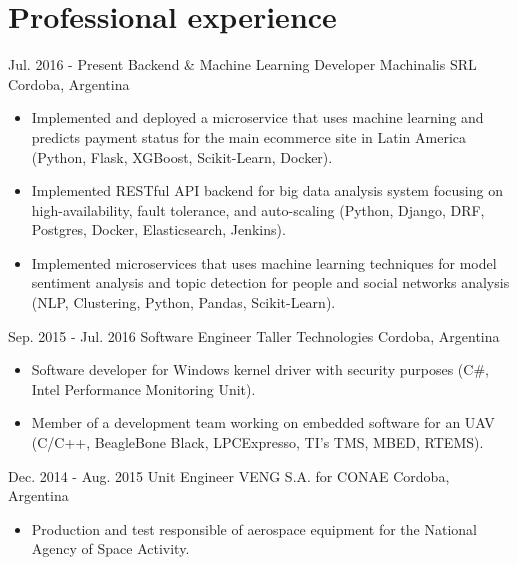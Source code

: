 
\section{Professional experience}

  \cventry
    {Jul. 2016 - Present} %
    {Backend \& Machine Learning Developer} %
    {Machinalis SRL} %
    {Cordoba, Argentina} %
    {}
    {
      \begin{itemize} %
        \item {Implemented and deployed a microservice that uses machine learning and predicts payment status for the main ecommerce site in Latin America (Python, Flask, XGBoost, Scikit-Learn, Docker).}
        \item {Implemented RESTful API backend for big data analysis system focusing on high-availability, fault tolerance, and auto-scaling (Python, Django, DRF, Postgres, Docker, Elasticsearch, Jenkins).}
        \item {Implemented microservices that uses machine learning techniques for model sentiment analysis and topic detection for people and social networks analysis (NLP, Clustering, Python, Pandas, Scikit-Learn).}
      \end{itemize}
    }

  \cventry
    {Sep. 2015 - Jul. 2016} %
    {Software Engineer} %
    {Taller Technologies} %
    {Cordoba, Argentina} %
    {}
    {
      \begin{itemize} %
        \item {Software developer for Windows kernel driver with security purposes (C\#, Intel Performance Monitoring Unit).}
        \item {Member of a development team working on embedded software for an UAV (C/C++, BeagleBone Black, LPCExpresso, TI's TMS, MBED, RTEMS).}
      \end{itemize}
    }

  \cventry
    {Dec. 2014 - Aug. 2015} %
    {Unit Engineer} %
    {VENG S.A. for CONAE} %
    {Cordoba, Argentina} %
    {}
    {
      \begin{itemize} %
        \item {Production and test responsible of aerospace equipment for the National Agency of Space Activity.}
      \end{itemize}
    }


